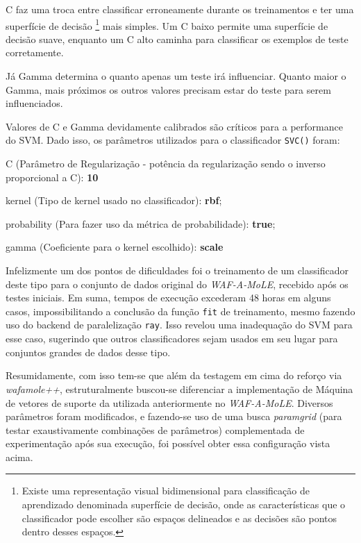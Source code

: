 C faz uma troca entre classificar erroneamente durante os treinamentos e ter uma superfície de decisão \footnote{Existe uma representação visual bidimensional para classificação de aprendizado denominada superfície de decisão, onde as características que o classificador pode escolher são espaços delineados e as decisões são pontos dentro desses espaços.} mais simples. Um C baixo permite uma superfície de decisão suave, enquanto um C alto caminha para classificar os exemplos de teste corretamente. 

Já Gamma determina o quanto apenas um teste irá influenciar. Quanto maior o Gamma, mais próximos os outros valores precisam estar do teste para serem influenciados.

Valores de C e Gamma devidamente calibrados são críticos para a performance do SVM. Dado isso, os parâmetros utilizados para o classificador \verb+SVC()+ foram:
\begin{alineas}
    \item C (Parâmetro de Regularização - potência da regularização sendo o inverso proporcional a C): \textbf{10} 
    \item kernel (Tipo de kernel usado no classificador): \textbf{rbf};
    \item probability (Para fazer uso da métrica de probabilidade): \textbf{true};
    \item gamma (Coeficiente para o kernel escolhido): \textbf{scale}
\end{alineas}

\bigskip

Infelizmente um dos pontos de dificuldades foi o treinamento de um classificador deste tipo para o conjunto de dados original do \textit{WAF-A-MoLE}, recebido após os testes iniciais. Em suma, tempos de execução excederam 48 horas em alguns casos, impossibilitando a conclusão da função \verb+fit+ de treinamento, mesmo fazendo uso do backend de paralelização \verb+ray+.  Isso revelou uma inadequação do SVM para esse caso, sugerindo que outros classificadores sejam usados em seu lugar para conjuntos grandes de dados desse tipo.

Resumidamente, com isso tem-se que além da testagem em cima do reforço via \textit{wafamole++}, estruturalmente buscou-se diferenciar a implementação de Máquina de vetores de suporte da utilizada anteriormente no \textit{WAF-A-MoLE}. Diversos parâmetros foram modificados, e fazendo-se uso de uma busca \textit{paramgrid} (para testar exaustivamente combinações de parâmetros) complementada de experimentação após sua execução, foi possível obter essa configuração vista acima. 

